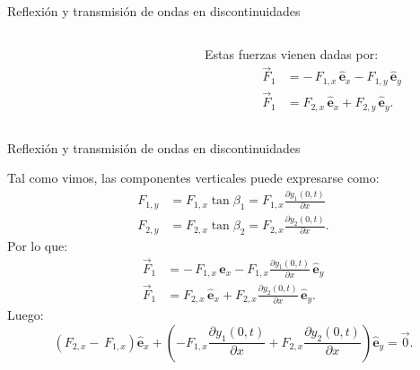 \documentclass[11pt,handout,aspectratio=1610]{beamer}
\newcommand{\pdiff}[2]{\frac{\partial #1}{\partial #2}}
\newcommand{\ver}[1]{\hat{\mathbf{#1}}}
\begin{document}
\begin{frame}{Reflexión y transmisión de ondas en discontinuidades}
\begin{columns}
\begin{column}{0.65\textwidth}
\begin{figure}
            \end{figure}
        \end{column}
        ~
        \begin{column}{0.35\textwidth}
            Estas fuerzas vienen dadas por:
            \begin{align*}
                \vec{F}_1 &= - \, F_{1,x} \, \ver{e}_x - F_{1,y} \, \ver{e}_y \\
                \vec{F}_1 &= F_{2,x} \, \ver{e}_x + F_{2,y} \, \ver{e}_y.
            \end{align*}
        \end{column}
    \end{columns}

\end{frame}

\begin{frame}{Reflexión y transmisión de ondas en discontinuidades}

    Tal como vimos, las componentes verticales puede expresarse como: 
    \begin{align*}
        F_{1,y} &= F_{1,x} \tan \beta_1 = F_{1,x} \pdiff{y_1 (0,t)}{x} \\
        F_{2,y} &= F_{2,x} \tan \beta_2 = F_{2,x} \pdiff{y_2 (0,t)}{x}.
    \end{align*} Por lo que: 
    \begin{align*}
        \vec{F}_1 &= - \, F_{1,x} \, \ver{e}_x - F_{1,x} \pdiff{y_1 (0,t)}{x} \, \ver{e}_y \\
        \vec{F}_1 &= F_{2,x} \, \ver{e}_x + F_{2,x} \pdiff{y_2 (0,t)}{x} \, \ver{e}_y.
    \end{align*} Luego: $$ \left(F_{2,x} - \, F_{1,x} \right) \ver{e}_x + \left(- F_{1,x} \pdiff{y_1 (0,t)}{x} + F_{2,x} \pdiff{y_2 (0,t)}{x} \right) \ver{e}_y = \vec{0}. $$

\end{frame}
\end{document}
